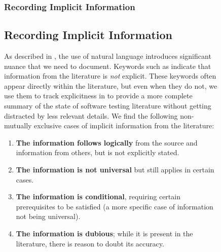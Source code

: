 \begin{figure}[h!]
\ifnotpaper\subsubsection{Recording Implicit Information}
\else\subsection{Recording Implicit Information}
\fi\label{imp-info}

As described in , the use of natural language introduces
significant nuance that we need to document. Keywords such as \impKeywords{}
indicate that information from the literature is \emph{not} explicit. These
keywords often appear directly within the literature, but even when they do
not, we use them to track explicitness in \ourApproachGlossary{} to
provide a more complete summary of the state of software testing literature
without getting distracted by less relevant details. We find the following
non-mutually exclusive cases of implicit information from the literature:

\begin{enumerate}
    \item \textbf{The information follows logically} from the source and
          information from others, but is not explicitly stated.
    \item \textbf{The information is not universal} but still applies in
          certain cases. \ifnotpaper
    \item \textbf{The information is conditional}, requiring certain
          prerequisites to be satisfied (a more specific case of information
          not being universal). \fi
    \item \textbf{The information is dubious}; while it is present in the
          literature, there is reason to doubt its accuracy.
\end{enumerate}


\end{figure}
